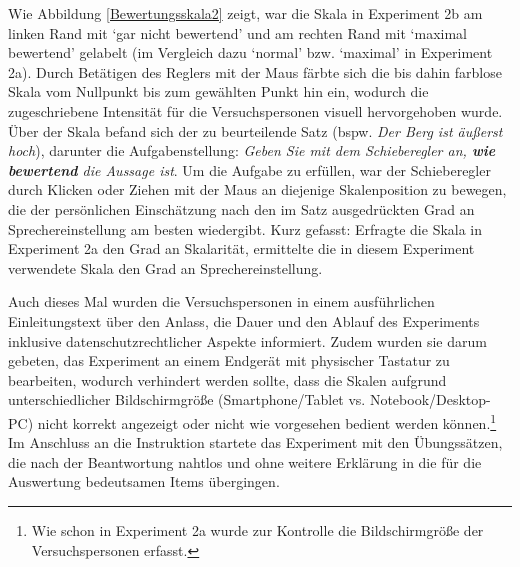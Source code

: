 
\noindent Wie Abbildung \ref{Bewertungsskala2} zeigt, war die Skala in Experiment 2b am linken Rand mit `gar nicht bewertend' und am rechten Rand mit `maximal bewertend' gelabelt (im Vergleich dazu `normal' bzw. `maximal' in {Experiment 2a}). Durch Betätigen des Reglers mit der Maus färbte sich die bis dahin farblose {Skala} vom Nullpunkt bis zum gewählten Punkt hin ein, wodurch die zugeschriebene Intensität für die Versuchspersonen visuell hervorgehoben wurde. Über der Skala befand sich der zu beurteilende Satz (bspw. \textit{Der Berg ist äußerst hoch}), darunter die Aufgabenstellung: \textit{Geben Sie mit dem {Schieberegler} an, \textbf{wie bewertend} die Aussage ist}. Um die Aufgabe zu erfüllen, war der Schieberegler durch Klicken oder Ziehen mit der Maus an diejenige Skalenposition zu bewegen, die der persönlichen Einschätzung nach den im Satz ausgedrückten Grad an Sprechereinstellung am besten wiedergibt. Kurz gefasst: Erfragte die Skala in Experiment 2a den Grad an Skalarität, ermittelte die in diesem Experiment verwendete Skala den Grad an {Sprechereinstellung}.


Auch dieses Mal wurden die Versuchspersonen in einem ausführlichen Einleitungstext über den Anlass, die Dauer und den Ablauf des Experiments inklusive datenschutzrechtlicher Aspekte informiert. Zudem wurden sie darum gebeten, das Experiment an einem Endgerät mit physischer Tastatur zu bearbeiten, wodurch verhindert werden sollte, dass die Skalen aufgrund unterschiedlicher Bildschirmgröße (Smartphone/Tablet vs. Notebook/Desktop-PC) nicht korrekt angezeigt oder nicht wie vorgesehen bedient werden können.\footnote{Wie schon in Experiment 2a wurde zur Kontrolle die Bildschirmgröße der Versuchspersonen erfasst.} Im Anschluss an die Instruktion startete das Experiment mit den Übungssätzen, die nach der Beantwortung nahtlos und ohne weitere Erklärung in die für die Auswertung bedeutsamen Items {übergingen}.



